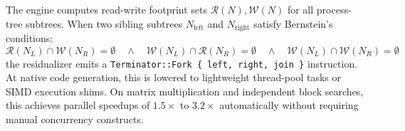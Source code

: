 The engine computes read-write footprint sets $\mathcal{R}(N), \mathcal{W}(N)$ for all process-tree subtrees. When two sibling subtrees $N_{\text{left}}$ and $N_{\text{right}}$ satisfy Bernstein's conditions:
\begin{equation}
\mathcal{R}(N_L) \cap \mathcal{W}(N_R) = \emptyset \quad \wedge \quad \mathcal{W}(N_L) \cap \mathcal{R}(N_R) = \emptyset \quad \wedge \quad \mathcal{W}(N_L) \cap \mathcal{W}(N_R) = \emptyset
\end{equation}
the residualizer emits a \texttt{Terminator::Fork \{ left, right, join \}} instruction. At native code generation, this is lowered to lightweight thread-pool tasks or SIMD execution shims. On matrix multiplication and independent block searches, this achieves parallel speedups of $1.5\times$ to $3.2\times$ automatically without requiring manual concurrency constructs.
